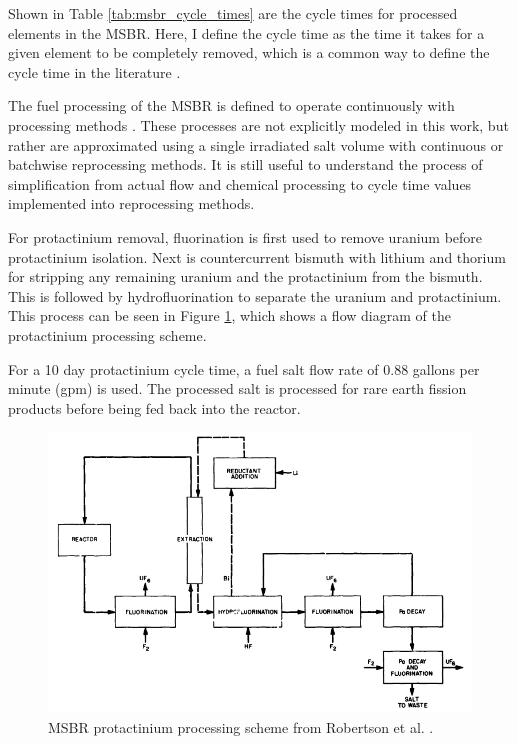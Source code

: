 
Shown in Table \ref{tab:msbr_cycle_times} are the cycle times for processed elements in the MSBR.
Here, I define the cycle time as the time it takes for a given element to be completely removed, which is a common way to define the cycle time in the literature \cite{betzler_molten_2017, rykhlevskii_modeling_2019, robertson_conceptual_1971}.

The fuel processing of the MSBR is defined to operate continuously with processing methods \cite{robertson_conceptual_1971}. These processes are not explicitly modeled in this work, but rather are approximated using a single irradiated salt volume with continuous or batchwise reprocessing methods. It is still useful to understand the process of simplification from actual flow and chemical processing to cycle time values implemented into reprocessing methods.

For protactinium removal, fluorination is first used to remove uranium before protactinium isolation. Next is countercurrent bismuth with lithium and thorium for stripping any remaining uranium and the protactinium from the bismuth. This is followed by hydrofluorination to separate the uranium and protactinium. This process can be seen in Figure \ref{fig:msbr_pa}, which shows a flow diagram of the protactinium processing scheme.

For a 10 day protactinium cycle time, a fuel salt flow rate of 0.88 gallons per minute (gpm) is used. The processed salt is processed for rare earth fission products before being fed back into the reactor.
\begin{figure}[H]
  \centering
  \includegraphics[scale=0.55]{images/msbr_pa_robertson.PNG}
  \caption{MSBR protactinium processing scheme from Robertson et al. \cite{robertson_conceptual_1971}.}
   \label{fig:msbr_pa}
\end{figure}

